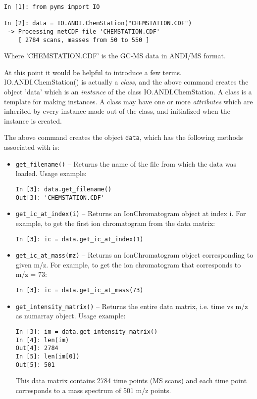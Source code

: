 \begin{verbatim}
In [1]: from pyms import IO

In [2]: data = IO.ANDI.ChemStation("CHEMSTATION.CDF")
 -> Processing netCDF file 'CHEMSTATION.CDF'
    [ 2784 scans, masses from 50 to 550 ]
\end{verbatim}

Where 'CHEMSTATION.CDF' is the GC-MS data in ANDI/MS format.

At this point it would be helpful to introduce a few terms.
IO.ANDI.ChemStation() is actually a {\em class}, and the above command
creates the object 'data' which is an {\em instance} of the class
IO.ANDI.ChemStation. A class is a template for making instances.
A class may have one or more {\em attributes} which are inherited
by every instance made out of the class, and initialized when the
instance is created.

The above command creates the object {\tt data}, which has the
following methods associated with is:

\begin{itemize}

\item {\tt get\_filename()} -- Returns the name of the file from which
the data was loaded. Usage example:

\begin{verbatim}
In [3]: data.get_filename()
Out[3]: 'CHEMSTATION.CDF'
\end{verbatim}

\item {\tt get\_ic\_at\_index(i)} -- Returns an IonChromatogram
object at index i. For example, to get the first ion chromatogram
from the data matrix:

\begin{verbatim}
In [3]: ic = data.get_ic_at_index(1)
\end{verbatim}

\item {\tt get\_ic\_at\_mass(mz)} -- Returns an IonChromatogram
object corresponding to given m/z. For example, to get the ion
chromatogram that corresponds to m/z = 73:

\begin{verbatim}
In [3]: ic = data.get_ic_at_mass(73)
\end{verbatim}

\item {\tt get\_intensity\_matrix()} -- Returns the entire data
matrix, i.e. time vs m/z as numarray object. Usage example:

\begin{verbatim}
In [3]: im = data.get_intensity_matrix()
In [4]: len(im)
Out[4]: 2784
In [5]: len(im[0])
Out[5]: 501
\end{verbatim}

This data matrix contains 2784 time points (MS scans) and each time
point corresponds to a mass spectrum of 501 m/z points.

\end{itemize}

